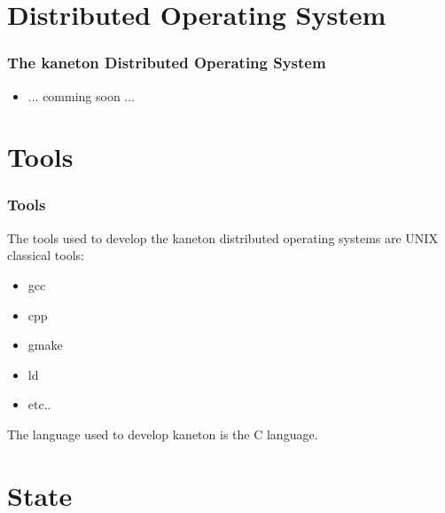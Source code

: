 \documentclass[8pt]{beamer}
\newcommand{\nl}[0]{\vspace{0.4cm}}
\begin{document}
%
%

\section{Distributed Operating System}

\begin{frame}
  \frametitle{The kaneton Distributed Operating System}

  \begin{itemize}[<+->]
    \item ... comming soon ...
  \end{itemize}
\end{frame}

%
%

\section{Tools}


\begin{frame}
  \frametitle{Tools}

  The tools used to develop the kaneton distributed operating systems
  are UNIX classical tools:

  \begin{itemize}
    \item
      gcc
    \item
      cpp
    \item
      gmake
    \item
      ld
    \item
      etc..
  \end{itemize}

  \nl

  The language used to develop kaneton is the C language.
\end{frame}

%
%

\section{State}

\end{document}
